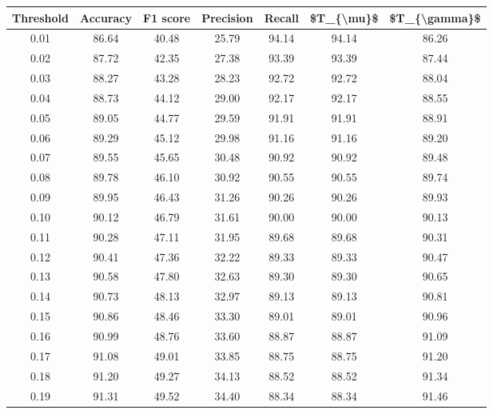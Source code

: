 \begin{tabular}{|c|c|c|c|c|c|c|}
\hline
 Threshold &  Accuracy &  F1 score &  Precision &  Recall &  \$T\_\{\textbackslash mu\}\$ &  \$T\_\{\textbackslash gamma\}\$ \\
\hline
      0.01 &     86.64 &     40.48 &      25.79 &   94.14 &      94.14 &         86.26 \\
      0.02 &     87.72 &     42.35 &      27.38 &   93.39 &      93.39 &         87.44 \\
      0.03 &     88.27 &     43.28 &      28.23 &   92.72 &      92.72 &         88.04 \\
      0.04 &     88.73 &     44.12 &      29.00 &   92.17 &      92.17 &         88.55 \\
      0.05 &     89.05 &     44.77 &      29.59 &   91.91 &      91.91 &         88.91 \\
      0.06 &     89.29 &     45.12 &      29.98 &   91.16 &      91.16 &         89.20 \\
      0.07 &     89.55 &     45.65 &      30.48 &   90.92 &      90.92 &         89.48 \\
      0.08 &     89.78 &     46.10 &      30.92 &   90.55 &      90.55 &         89.74 \\
      0.09 &     89.95 &     46.43 &      31.26 &   90.26 &      90.26 &         89.93 \\
      0.10 &     90.12 &     46.79 &      31.61 &   90.00 &      90.00 &         90.13 \\
      0.11 &     90.28 &     47.11 &      31.95 &   89.68 &      89.68 &         90.31 \\
      0.12 &     90.41 &     47.36 &      32.22 &   89.33 &      89.33 &         90.47 \\
      0.13 &     90.58 &     47.80 &      32.63 &   89.30 &      89.30 &         90.65 \\
      0.14 &     90.73 &     48.13 &      32.97 &   89.13 &      89.13 &         90.81 \\
      0.15 &     90.86 &     48.46 &      33.30 &   89.01 &      89.01 &         90.96 \\
      0.16 &     90.99 &     48.76 &      33.60 &   88.87 &      88.87 &         91.09 \\
      0.17 &     91.08 &     49.01 &      33.85 &   88.75 &      88.75 &         91.20 \\
      0.18 &     91.20 &     49.27 &      34.13 &   88.52 &      88.52 &         91.34 \\
      0.19 &     91.31 &     49.52 &      34.40 &   88.34 &      88.34 &         91.46 \\

\end{tabular}

